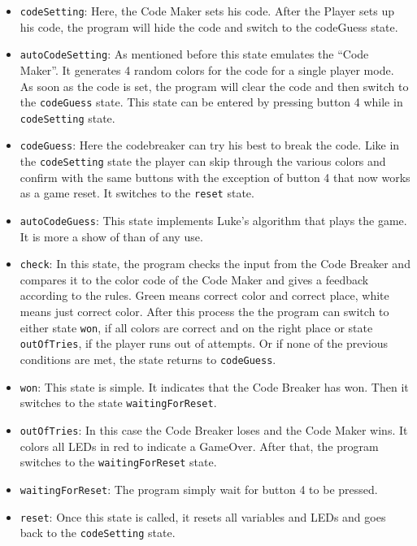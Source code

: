 \documentclass[a4paper, 12pt]{article}
\begin{document}
\begin{itemize}

    \item {\tt codeSetting}: Here, the Code Maker sets his code. After
        the Player sets up his code, the program will hide the code and
        switch to the codeGuess state.

    \item {\tt autoCodeSetting}: As mentioned before this state emulates the
        “Code Maker”. It generates 4 random colors for the code for a
        single player mode. As soon as the code is set, the program will
        clear the code and then switch to the {\tt codeGuess} state. This
        state can be entered by pressing button 4 while in {\tt codeSetting}
        state. 

    \item {\tt codeGuess}: Here the codebreaker can try his best to break the
        code. Like in the {\tt codeSetting} state the player can skip through
        the various colors and confirm with the same buttons with the
        exception of button 4 that now works as a game reset. It
        switches to the {\tt reset} state. 

    \item {\tt autoCodeGuess}: This state implements Luke’s algorithm that
        plays the game. It is more a show of than of any use. 

    \item {\tt check}: In this state, the program checks the input from the
        Code Breaker and compares it to the color code of the Code Maker
        and gives a feedback according to the rules. Green means correct
        color and correct place, white means just correct color. After
        this process the the program can switch to either state {\tt won}, if
        all colors are correct and on the right place or state
        {\tt outOfTries}, if the player runs out of attempts. Or if none of
        the previous conditions are met, the state returns to {\tt codeGuess}. 

    \item {\tt won}: This state is simple. It indicates that the Code Breaker
        has won. Then it switches to the state {\tt waitingForReset}.

    \item {\tt outOfTries}: In this case the Code Breaker loses and the Code
        Maker wins. It colors all LEDs in red to indicate a GameOver.
        After that, the program switches to the {\tt waitingForReset} state.

    \item {\tt waitingForReset}: The program simply wait for button 4 to
        be pressed.
        
    \item {\tt reset}: Once this state is called, it resets all variables and
        LEDs and goes back to the {\tt codeSetting} state. 

\end{itemize}
\end{document}

